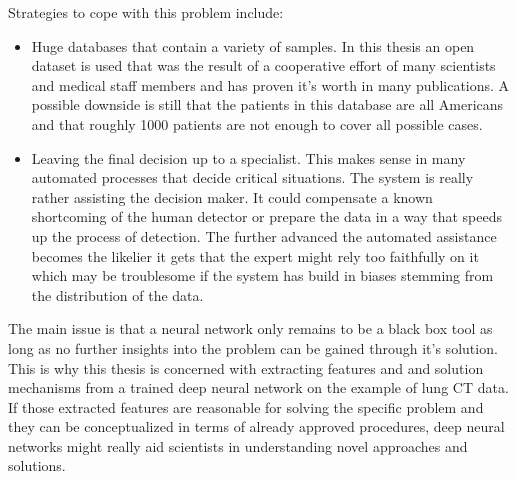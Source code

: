\documentclass[main.tex]{subfiles}
\begin{document}
Strategies to cope with this problem include:
\begin{itemize}
\item Huge databases that contain a variety of samples. In this thesis an open dataset is used that was
the result of a cooperative effort of many scientists and medical staff members and has proven
it's worth in many publications. A possible downside is still that the patients in this database are all Americans and that roughly 1000 patients are not enough to cover all possible cases.

\item Leaving the final decision up to a specialist. This makes sense in many automated processes that decide critical situations. The system is really rather assisting the decision maker. It could compensate a known shortcoming of the human detector or prepare the data in a way that speeds up the process of detection. The further advanced the automated assistance becomes the likelier it gets that the expert might rely too faithfully on it which may be troublesome if the system has build in biases stemming from the distribution of the data.
\end{itemize}

The main issue is that a neural network only remains to be a black box tool as long as no further insights into
the problem can be gained through it's solution. This is why this thesis is concerned with extracting
features and and solution mechanisms from a trained deep neural network on the example of lung CT data. If those extracted features are reasonable for solving the specific problem and they can be conceptualized in terms of already approved procedures, deep neural networks might really aid scientists in understanding novel approaches and solutions.
\end{document}
